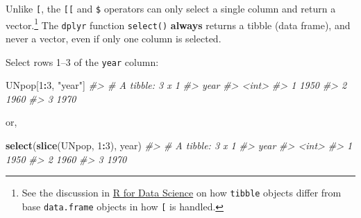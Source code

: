 \documentclass[]{book}
\newenvironment{Shaded}{\begin{snugshade}}{\end{snugshade}}
\newcommand{\CommentTok}[1]{\textcolor[rgb]{0.56,0.35,0.01}{\textit{#1}}}
\newcommand{\DecValTok}[1]{\textcolor[rgb]{0.00,0.00,0.81}{#1}}
\newcommand{\KeywordTok}[1]{\textcolor[rgb]{0.13,0.29,0.53}{\textbf{#1}}}
\newcommand{\NormalTok}[1]{#1}
\newcommand{\OperatorTok}[1]{\textcolor[rgb]{0.81,0.36,0.00}{\textbf{#1}}}
\newcommand{\StringTok}[1]{\textcolor[rgb]{0.31,0.60,0.02}{#1}}
\let\rmarkdownfootnote\footnote%
\def\footnote{\protect\rmarkdownfootnote}
\theoremstyle{definition}
\theoremstyle{definition}
\theoremstyle{definition}
\theoremstyle{remark}
\begin{document}
\begin{Shaded}
\end{Shaded}

Unlike \texttt{{[}}, the \texttt{{[}{[}} and \texttt{\$} operators can
only select a single column and return a vector.\footnote{See the
  discussion in
  \href{http://r4ds.had.co.nz/tibbles.html\#tibbles-vs.data.frame}{R for
  Data Science} on how \texttt{tibble} objects differ from base
  \texttt{data.frame} objects in how \texttt{{[}} is handled.} The
\texttt{dplyr} function \texttt{select()} \textbf{always} returns a
tibble (data frame), and never a vector, even if only one column is
selected.

Select rows 1--3 of the \texttt{year} column:

\begin{Shaded}
\begin{Highlighting}[]
\NormalTok{UNpop[}\DecValTok{1}\OperatorTok{:}\DecValTok{3}\NormalTok{, }\StringTok{"year"}\NormalTok{]}
\CommentTok{#> # A tibble: 3 x 1}
\CommentTok{#>    year}
\CommentTok{#>   <int>}
\CommentTok{#> 1  1950}
\CommentTok{#> 2  1960}
\CommentTok{#> 3  1970}
\end{Highlighting}
\end{Shaded}

or,

\begin{Shaded}
\begin{Highlighting}[]
\KeywordTok{select}\NormalTok{(}\KeywordTok{slice}\NormalTok{(UNpop, }\DecValTok{1}\OperatorTok{:}\DecValTok{3}\NormalTok{), year)}
\CommentTok{#> # A tibble: 3 x 1}
\CommentTok{#>    year}
\CommentTok{#>   <int>}
\CommentTok{#> 1  1950}
\CommentTok{#> 2  1960}
\CommentTok{#> 3  1970}
\end{Highlighting}
\end{Shaded}
\end{document}
